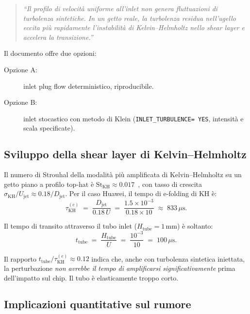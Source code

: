 \documentclass[11pt,a4paper]{article}
\newcommand{\ttcfg}[1]{\texttt{\color{codegray}#1}}
\newcommand{\Djet}{D_{\mathrm{jet}}}
\newcommand{\Str}{\mathrm{St}}
\newcommand{\mus}{\,\mu\mathrm{s}}
\begin{document}
\begin{quote}\small\itshape
``Il profilo di velocità uniforme all'inlet non genera fluttuazioni
di turbolenza sintetiche. In un getto reale, la turbolenza residua
nell'ugello eccita più rapidamente l'instabilità di Kelvin--Helmholtz
nello shear layer e accelera la transizione.''
\end{quote}

Il documento offre due opzioni:
\begin{description}
  \item[Opzione A:] inlet plug flow deterministico, riproducibile.
  \item[Opzione B:] inlet stocastico con metodo di Klein
    (\ttcfg{INLET\_TURBULENCE= YES}, intensità e scala
    specificate).
\end{description}

\subsection{Sviluppo della shear layer di Kelvin--Helmholtz}

Il numero di Strouhal della modalità più amplificata di
Kelvin--Helmholtz su un getto piano a profilo top-hat è
$\Str_{\mathrm{KH}}\approx 0.017$~\cite{Michalke1965}, con tasso di
crescita $\sigma_{\mathrm{KH}}/U_{\mathrm{jet}}\approx 0.18/\Djet$.
Per il caso Huawei, il tempo di e-folding di KH è:
\begin{equation}
  \tau_{\mathrm{KH}}^{(e)} \;=\; \frac{\Djet}{0.18\,U}
   \;=\; \frac{1.5\times 10^{-3}}{0.18\times 10}
   \;\approx\; 833\mus.
\end{equation}

Il tempo di transito attraverso il tubo inlet ($H_{\mathrm{tube}}=
1\,\mathrm{mm}$) è soltanto:
\begin{equation}
  t_{\mathrm{tube}} \;=\; \frac{H_{\mathrm{tube}}}{U}
   \;=\; \frac{10^{-3}}{10}
   \;=\; 100\mus.
\end{equation}

Il rapporto $t_{\mathrm{tube}}/\tau_{\mathrm{KH}}^{(e)}\approx 0.12$
indica che, anche con turbolenza sintetica iniettata, la
perturbazione \emph{non avrebbe il tempo di amplificarsi
significativamente} prima dell'impatto sul chip. Il tubo è
elasticamente troppo corto.

\subsection{Implicazioni quantitative sul rumore}
\end{document}
